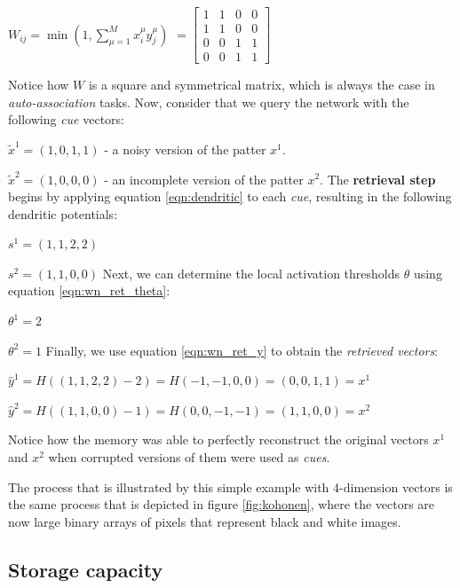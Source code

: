 \documentclass{article}
\begin{document}
$W_{i j}=\min \left(1, \sum_{\mu=1}^{M} x_{i}^{\mu} y_{j}^{\mu}\right)$
$=\left[\begin{array}{llll}
1 & 1 & 0 & 0 \\
1 & 1 & 0 & 0 \\
0 & 0 & 1 & 1 \\
0 & 0 & 1 & 1 
\end{array}\right]$
\newline

Notice how $W$ is a square and symmetrical matrix, which is always the case in \textit{auto-association} tasks.
\newline
\newline
Now, consider that we query the network with the following \textit{cue} vectors:

$\tilde{x}^{1} = (1,0,1,1)$ - a noisy version of the patter $x^{1}$. 

$\tilde{x}^{2} = (1,0,0,0)$ - an incomplete version of  the patter $x^{2}$.
\newline
\newline
The \textbf{retrieval step} begins by applying equation \ref{eqn:dendritic} to each \textit{cue}, resulting in the following dendritic potentials:

$s^1=(1,1,2,2)$

$s^2=(1,1,0,0)$
\newline
Next, we can determine the local activation thresholds $\theta$ using equation \ref{eqn:wn_ret_theta}:

$\theta^1=2$

$\theta^2=1$
\newline
Finally, we use equation \ref{eqn:wn_ret_y} to obtain the \textit{retrieved vectors}:

$\hat{y}^1 = H((1,1,2,2) - 2) = H(-1,-1,0,0) = (0,0,1,1) = x^1$

$\hat{y}^2 = H((1,1,0,0) - 1) = H(0,0,-1,-1) = (1,1,0,0) = x^2$
\newline

Notice how the memory was able to perfectly reconstruct the original vectors $x^1$ and $x^2$ when corrupted versions of them were used as \textit{cues}. 

The process that is illustrated by this simple example with 4-dimension vectors is the same process that is depicted in figure \ref{fig:kohonen}, where the vectors are now large binary arrays of pixels that represent black and white images.
\newpage

\subsection{Storage capacity}
\end{document}

